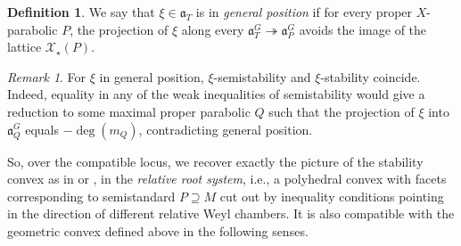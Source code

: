 \documentclass[openany]{amsbook}
\theoremstyle{definition}
\newtheorem{definition}[theorem]{Definition}
\theoremstyle{remark}
\newtheorem{remark}[theorem]{Remark}
\numberwithin{equation}{section}
\newcommand{\cX}{\mathcal{X}}
\renewcommand{\-}{\operatorname{-}}
\renewcommand{\a}{\mathfrak{a}}
\begin{document}
\begin{definition}\label{def.gen.pos}
We say that $\xi \in \a_T$ is in \textit{general position} if for every proper $X$-parabolic $P$, the projection of $\xi$ along every $\a_T^G \twoheadrightarrow \a_{P}^G$ avoids the image of the lattice $\cX_\star(P)$.
\end{definition}

\begin{remark}
    For $\xi$ in general position, $\xi$-semistability and $\xi$-stability coincide. Indeed, equality in any of the weak inequalities of semistability would give a reduction to some maximal proper parabolic $Q$ such that the projection of $\xi$ into $\a_Q^G$ equals $-\deg(m_Q)$, contradicting general position.
\end{remark}






So, over the compatible locus, we recover exactly the picture of the stability convex as in \cite{CLI} or \cite{behrendsemistable}, in the \textit{relative root system}, i.e., a polyhedral convex with facets corresponding to semistandard $P \supseteq M$ cut out by inequality conditions pointing in the direction of different relative Weyl chambers. It is also compatible with the geometric convex defined above in the following senses.
\end{document}
